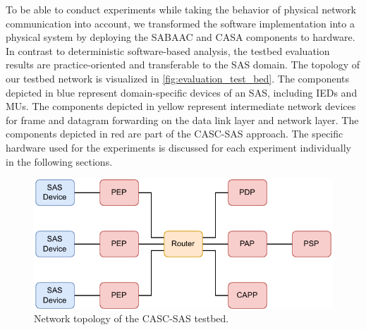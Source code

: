 To be able to conduct experiments while taking the behavior of physical network communication into account, we transformed the software implementation into a physical system by deploying the SABAAC and CASA components to hardware.
In contrast to deterministic software-based analysis, the testbed evaluation results are practice-oriented and transferable to the SAS domain.
The topology of our testbed network is visualized in \autoref{fig:evaluation_test_bed}.
The components depicted in blue represent domain-specific devices of an SAS, including IEDs and MUs.
The components depicted in yellow represent intermediate network devices for frame and datagram forwarding on the data link layer and network layer.
The components depicted in red are part of the CASC-SAS approach.
The specific hardware used for the experiments is discussed for each experiment individually in the following sections.
\begin{figure}
    \centering
    \includegraphics[width=0.8\linewidth]{figures/network_testbed_color.drawio.pdf}
    \caption{Network topology of the CASC-SAS testbed.}
    \label{fig:evaluation_test_bed}
\end{figure}
%

